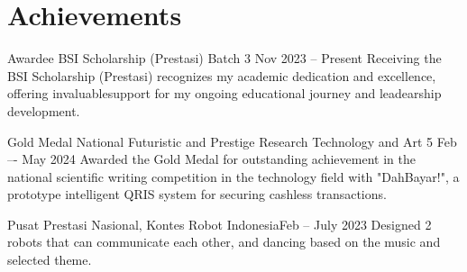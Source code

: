 \section{Achievements}
\resumeSubHeadingListStart
    
    \achiSubheading
    {Awardee BSI Scholarship (Prestasi) Batch 3 }{Nov 2023 -- Present}
    {Receiving the BSI Scholarship (Prestasi) recognizes my academic dedication and excellence, offering invaluablesupport for my ongoing educational journey and leadearship development.}{}

    \achiSubheading
    {Gold Medal National Futuristic and Prestige Research Technology and Art 5 }{Feb –- May 2024}
    {Awarded the Gold Medal for outstanding achievement in the national scientific writing competition in the technology field with "DahBayar!", a prototype intelligent QRIS system for securing cashless transactions.}{}
    
    \achiSubheading
    {Pusat Prestasi Nasional, Kontes Robot Indonesia}{Feb -- July 2023}
    {Designed 2 robots that can communicate each other, and dancing based on the music and selected theme.}{}
    \resumeItemListStart
    \resumeItemListEnd

\resumeSubHeadingListEnd